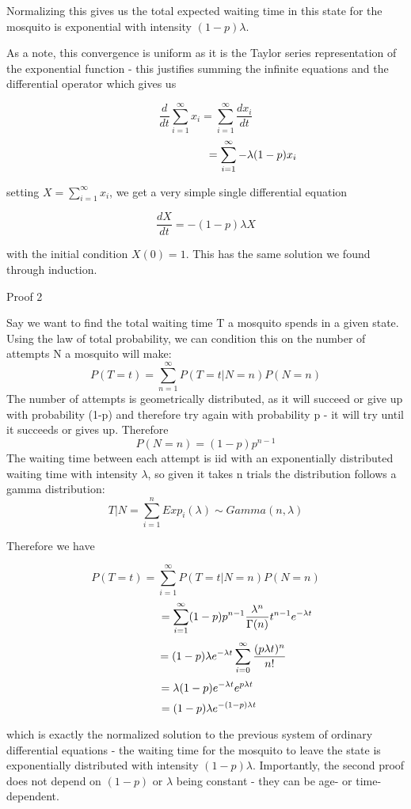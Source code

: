 \documentclass{article}
\begin{document}
Normalizing this gives us the total expected waiting time in this state for the
mosquito is exponential with intensity $(1-p) \lambda$.

As a note, this convergence is uniform as it is the Taylor series representation
of the exponential function - this justifies summing the infinite equations and
the differential operator which gives us

$$\frac{d}{dt} \sum_{i=1}^{\infty} x_i = \sum_{i=1}^{\infty}\frac{d x_i}{dt}$$
$$\hspace*{3cm} = \sum_{i=1}^{\infty}-\lambda (1-p) x_i$$

setting $X = \sum_{i=1}^{\infty}x_i$, we get a very simple single differential equation

$$\frac{dX}{dt} = - (1-p) \lambda X$$

with the initial condition $X(0) = 1$. This has the same solution we found through induction.

\begin{bf}
Proof 2
\end{bf}

Say we want to find the total waiting time T a mosquito spends in a given state.
Using the law of total probability, we can condition this on the number of attempts N
a mosquito will make:
$$P(T=t) = \sum_{n=1}^{\infty} P(T=t| N=n) P(N=n)$$
The number of attempts is geometrically distributed, as it will succeed or give up
with probability (1-p) and therefore try again with probability p - it will try until
it succeeds or gives up. Therefore
$$P(N=n) = (1-p)p^{n-1}$$
The waiting time between each attempt is iid with an exponentially distributed waiting
time with intensity $\lambda$, so given it takes n trials the distribution follows
a gamma distribution:
$$T|N = \sum_{i=1}^{n}Exp_i(\lambda) \sim Gamma (n,\lambda)$$

Therefore we have

$$P(T=t) = \sum_{i=1}^{\infty}P(T=t|N=n)P(N=n)$$
$$ \hspace*{2cm} = \sum_{i=1}^{\infty}(1-p)p^{n-1}\frac{\lambda^n}{\Gamma (n)}t^{n-1} e^{-\lambda t}$$
$$ \indent \hspace*{.5cm} = (1-p) \lambda e^{-\lambda t} \sum_{i=0}^{\infty} \frac{(p\lambda t)^n}{n!}$$
$$ \hspace*{.1cm} = \lambda (1-p) e^{-\lambda t} e^{p\lambda t}$$
$$\hspace*{.2cm} = (1-p) \lambda e^{-(1-p) \lambda t} $$

which is exactly the normalized solution to the previous system of ordinary differential
equations - the waiting time for the mosquito to leave the state is exponentially 
distributed with intensity $(1-p) \lambda$. Importantly, the second proof does not depend on $(1-p)$ or $\lambda$ being constant - they can be age- or time-dependent.
\end{document}

